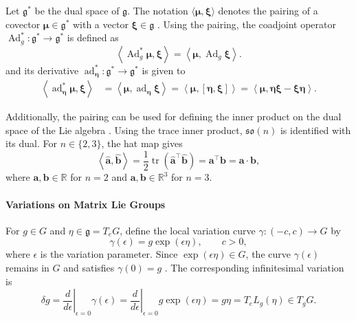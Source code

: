 Let \(\mathfrak{g}^{*}\) be the dual space of \(\mathfrak{g}\). The notation \(\langle\bm{\mu},\bm{\xi}\rangle\) denotes the pairing of a covector \(\bm{\mu}\in\mathfrak{g}^{*}\) with a vector \(\bm{\xi}\in\mathfrak{g}\) \cite{Lee2008}. 
Using the pairing, the coadjoint operator \(\operatorname{Ad}_{g}^{*}:\mathfrak{g}^{*}\rightarrow\mathfrak{g}^{*}\) is defined as 
\begin{equation}
    \left\langle
        \operatorname{Ad}_{g}^{*}\bm{\mu},
        \bm{\xi}
    \right\rangle
    =
    \left\langle
        \bm{\mu},
        \operatorname{Ad}_{g}\bm{\xi}
    \right\rangle.
    \label{eq:coadjoint_definition}
\end{equation}
and its derivative \(\operatorname{ad}_{\bm{\eta}}^{*}:\mathfrak{g}^{*}\rightarrow\mathfrak{g}^{*}\) is given to
\begin{align}
    \left\langle\operatorname{ad}_{\bm{\eta}}^{*}\bm{\mu},\bm{\xi}\right\rangle
    &=
    \left\langle\bm{\mu},\operatorname{ad}_{\bm{\eta}}\bm{\xi}\right\rangle
    =
    \left\langle\bm{\mu},[\bm{\eta},\bm{\xi}]\right\rangle
    =
        \left\langle\bm{\mu},\bm{\eta}\bm{\xi} - \bm{\xi}\bm{\eta}\right\rangle
.
    \label{eq:coad_definition}
\end{align}

Additionally, the pairing can be used for defining the inner product on the dual space of the Lie algebra \cite{Lee2008}. Using the trace inner product, $\mathfrak{so}(n)$ is identified with its
dual. For $n\in\{2,3\}$, the hat map gives
\begin{equation}
    \left\langle\widehat{\bm a},\widehat{\bm b}\right\rangle
    =
    \frac{1}{2}\operatorname{tr}\!\left(
        \widehat{\bm a}^{\top}\widehat{\bm b}
    \right)
    =
    \bm a^{\top}\bm b = \bm{a} \cdot \bm{b},
    \label{eq:trace_inner_product}
\end{equation}
where $\bm a,\bm b\in\mathbb{R}$ for $n=2$ and
$\bm a,\bm b\in\mathbb{R}^{3}$ for $n=3$.


\paragraph{Variations on Matrix Lie Groups}

For $g\in G$ and $\eta\in\mathfrak{g}=T_eG$, define the local variation
curve $\gamma:(-c,c)\rightarrow G$ by
\begin{equation}
    \gamma(\epsilon)
    =
    g\exp(\epsilon\eta),
    \qquad c>0,
    \label{eq:variation_curve_matrix_lie_group}
\end{equation}
where $\epsilon$ is the variation parameter. Since
$\exp(\epsilon\eta)\in G$, the curve $\gamma(\epsilon)$ remains in
$G$ and satisfies $\gamma(0)=g$ \cite{Lee2008}. The corresponding
infinitesimal variation is
\begin{equation}
    \delta g
    =
    \left.
    \frac{d}{d\epsilon}
    \right|_{\epsilon=0}
    \gamma(\epsilon)
    =
    \left.
    \frac{d}{d\epsilon}
    \right|_{\epsilon=0}
    g\exp(\epsilon\eta)
    =
    g\eta
    =
    T_eL_g(\eta)
    \in T_gG.
    \label{eq:infinitesimal_variation_matrix_lie_group}
\end{equation}


